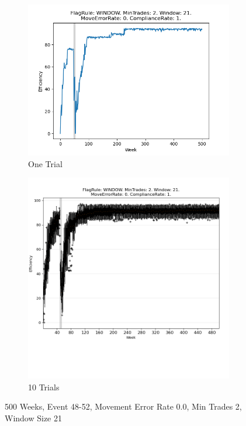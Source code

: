 \documentclass{article}%
\begin{document}
\begin{figure}[!htb]%
\begin{subfigure}[b]{0.45\linewidth}%
\includegraphics[width=\linewidth]{1054fr_WINDOW_mt_2_ws_21_er_0_cr_1_t1.png}%
\caption{One Trial}%
\end{subfigure}%
\begin{subfigure}[b]{0.45\linewidth}%
\includegraphics[clip,width=\linewidth,trim=0 4cm 0 0]{1054fr_WINDOW_mt_2_ws_21_er_0_cr_1_t10.png}%
\caption{10 Trials}%
\end{subfigure}%
\caption{500 Weeks, Event 48{-}52, Movement Error Rate 0.0, Min Trades 2, Window Size 21}%
\end{figure}
\end{document}
